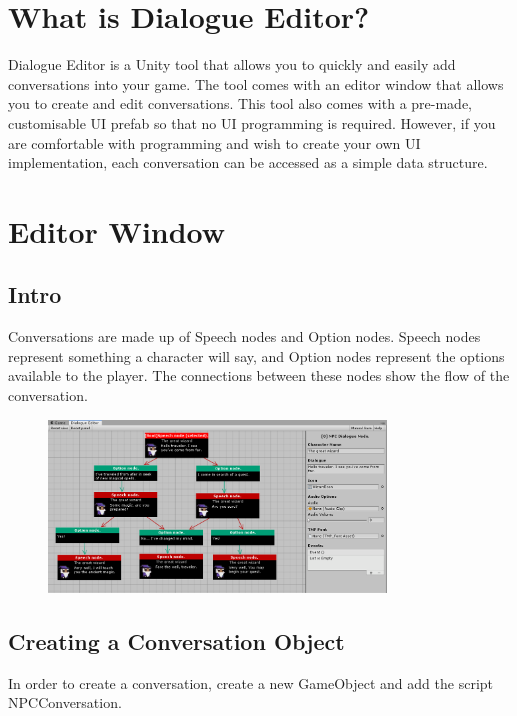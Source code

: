 \documentclass[a4paper,12pt]{article}
\begin{document}
\section{What is Dialogue Editor?}
\hypertarget{_whatis}{}
Dialogue Editor is a Unity tool that allows you to quickly and easily add conversations into your game.
\newline
The tool comes with an editor window that allows you to create and edit conversations.
\newline
This tool also comes with a pre-made, customisable UI prefab so that no UI programming is required. However, if you are comfortable with programming and wish to create your own UI implementation, each conversation can be accessed as a simple data structure.
\newpage


\section{Editor Window}
\hypertarget{_editorwindow}{}

\subsection{Intro}
Conversations are made up of Speech nodes and Option nodes. Speech nodes represent something a character will say, and Option nodes represent the options available to the player. The connections between these nodes show the flow of the conversation. 

\begin{figure}[ht]
\centering
\includegraphics[width=0.8\textwidth, keepaspectratio]{img/EditorWindowFullConversation.png}
\end{figure}


\subsection{Creating a Conversation Object}
In order to create a conversation, create a new GameObject and add the script NPCConversation. 
\end{document}
